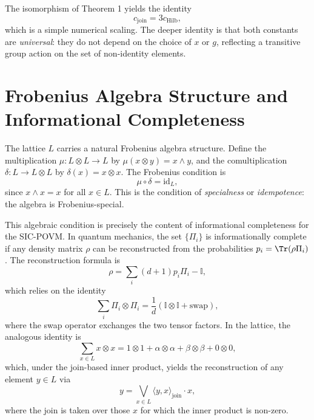 \documentclass{article}
\begin{document}
The isomorphism of Theorem 1 yields the identity
\begin{equation}
c_{\text{join}} = 3 c_{\text{Hilb}},
\end{equation}
which is a simple numerical scaling. The deeper identity is that both constants are \emph{universal}: they do not depend on the choice of $x$ or $g$, reflecting a transitive group action on the set of non-identity elements.

\section{Frobenius Algebra Structure and Informational Completeness}

The lattice $L$ carries a natural Frobenius algebra structure. Define the multiplication $\mu: L \otimes L \to L$ by $\mu(x \otimes y) = x \wedge y$, and the comultiplication $\delta: L \to L \otimes L$ by $\delta(x) = x \otimes x$. The Frobenius condition is
\begin{equation}
\mu \circ \delta = \mathrm{id}_L,
\end{equation}
since $x \wedge x = x$ for all $x \in L$. This is the condition of \emph{specialness} or \emph{idempotence}: the algebra is Frobenius-special.

This algebraic condition is precisely the content of informational completeness for the SIC-POVM. In quantum mechanics, the set $\{\Pi_i\}$ is informationally complete if any density matrix $\rho$ can be reconstructed from the probabilities $p_i = \Tr(\rho \Pi_i)$. The reconstruction formula is
\begin{equation}
\rho = \sum_i (d+1) p_i \Pi_i - \mathbb{I},
\end{equation}
which relies on the identity
\begin{equation}
\sum_i \Pi_i \otimes \Pi_i = \frac{1}{d} (\mathbb{I} \otimes \mathbb{I} + \text{swap}),
\end{equation}
where the swap operator exchanges the two tensor factors. In the lattice, the analogous identity is
\begin{equation}
\sum_{x \in L} x \otimes x = 1 \otimes 1 + \alpha \otimes \alpha + \beta \otimes \beta + 0 \otimes 0,
\end{equation}
which, under the join-based inner product, yields the reconstruction of any element $y \in L$ via
\begin{equation}
y = \bigvee_{x \in L} \langle y, x \rangle_{\text{join}} \cdot x,
\end{equation}
where the join is taken over those $x$ for which the inner product is non-zero.
\end{document}
